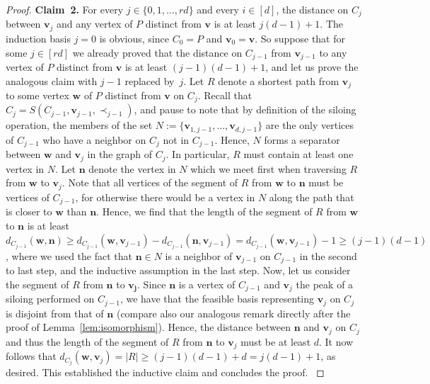 \documentclass[centering,11pt,reqno]{amsart}
\theoremstyle{definition}
\newenvironment{claimproof}[1][\proofname]{\proof[#1]\renewcommand{\qedsymbol}{$\blacksquare$}}{\endproof}
\begin{document}
\begin{proof}
\textbf{Claim~2.} For every $j\in \{0,1,\ldots,rd\}$ and every $i\in [d]$, the distance on $C_j$ between $\mathbf{v}_j$ and any vertex of $P$ distinct from $\mathbf{v}$ is at least $j(d-1)+1$.
\begin{claimproof}
The induction basis $j=0$ is obvious, since $C_0=P$ and $\mathbf{v}_0=\mathbf{v}$. So suppose that for some $j\in [rd]$ we already proved that the distance on $C_{j-1}$ from $\mathbf{v}_{j-1}$ to any vertex of $P$ distinct from $\mathbf{v}$ is at least $(j-1)(d-1)+1$, and let us prove the analogous claim with $j-1$ replaced by~$j$. Let $R$ denote a shortest path from $\mathbf{v}_j$ to some vertex $\mathbf{w}$ of $P$ distinct from $\mathbf{v}$ on $C_j$. Recall that $C_j=S(C_{j-1},\mathbf{v}_{j-1},\prec_{j-1})$, and pause to note that by definition of the siloing operation, the members of the set $N:=\{\mathbf{v}_{1,j-1},\ldots,\mathbf{v}_{d,j-1}\}$ are the only vertices of $C_{j-1}$ who have a neighbor on $C_j$ not in $C_{j-1}$. Hence, $N$ forms a separator between  $\mathbf{w}$ and $\mathbf{v}_j$ in the graph of $C_j$. In particular, $R$ must contain at least one vertex in $N$. Let $\mathbf{n}$ denote the vertex in $N$ which we meet first when traversing $R$ from $\mathbf{w}$ to $\mathbf{v}_j$. Note that all vertices of the segment of $R$ from $\mathbf{w}$ to $\mathbf{n}$ must be vertices of $C_{j-1}$, for otherwise there would be a vertex in $N$ along the path that is closer to $\mathbf{w}$ than $\mathbf{n}$. Hence, we find that the length of the segment of $R$ from $\mathbf{w}$ to $\mathbf{n}$ is at least $d_{C_{j-1}}(\mathbf{w},\mathbf{n})\ge d_{C_{j-1}}(\mathbf{w},\mathbf{v}_{j-1})-d_{C_{j-1}}(\mathbf{n},\mathbf{v}_{j-1})=d_{C_{j-1}}(\mathbf{w},\mathbf{v}_{j-1})-1\ge (j-1)(d-1)$, where we used the fact that $\mathbf{n}\in N$ is a neighbor of $\mathbf{v}_{j-1}$ on $C_{j-1}$ in the second to last step, and the inductive assumption in the last step. Now, let us consider the segment of $R$ from $\mathbf{n}$ to $\mathbf{v_j}$. Since $\mathbf{n}$ is a vertex of $C_{j-1}$ and $\mathbf{v}_j$ the peak of a siloing performed on $C_{j-1}$, we have that the feasible basis representing $\mathbf{v}_j$ on $C_j$ is disjoint from that of $\mathbf{n}$ (compare also our analogous remark directly after the proof of Lemma~\ref{lem:isomorphism}). Hence, the distance between $\mathbf{n}$ and $\mathbf{v}_j$ on $C_j$ and thus the length of the segment of $R$ from $\mathbf{n}$ to 
$\mathbf{v}_j$ must be at least $d$. It now follows that $d_{C_j}(\mathbf{w},\mathbf{v}_j)=|R|\ge (j-1)(d-1)+d=j(d-1)+1$, as desired. This established the inductive claim and concludes the proof.
\end{claimproof}
\end{proof}
\end{document}
